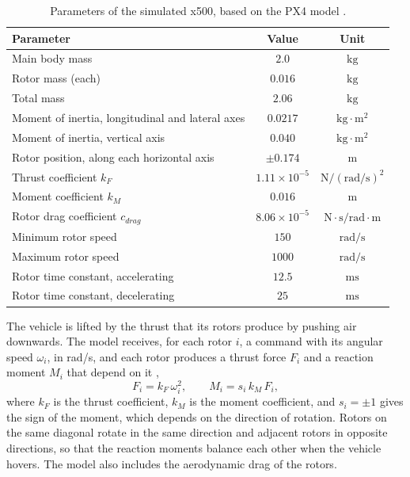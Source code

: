 \begin{table}[!htbp]
    \centering
    \caption{Parameters of the simulated x500, based on the PX4 model \cite{px4_x500_model}.}
    \label{tab:x500_parameters}
    \begin{tabular}{lcc}
        \toprule
        \textbf{Parameter} & \textbf{Value} & \textbf{Unit} \\
        \midrule
        Main body mass & $2.0$ & $\text{kg}$ \\
        Rotor mass (each) & $0.016$ & $\text{kg}$ \\
        Total mass & $2.06$ & $\text{kg}$ \\
        Moment of inertia, longitudinal and lateral axes & $0.0217$ & $\text{kg}\cdot\text{m}^2$ \\
        Moment of inertia, vertical axis & $0.040$ & $\text{kg}\cdot\text{m}^2$ \\
        Rotor position, along each horizontal axis & $\pm 0.174$ & $\text{m}$ \\
        \midrule
        Thrust coefficient $k_F$ & $1.11\times 10^{-5}$ & $\text{N}/(\text{rad/s})^2$ \\
        Moment coefficient $k_M$ & $0.016$ & $\text{m}$ \\
        Rotor drag coefficient $c_{drag}$ & $8.06\times 10^{-5}$ & $\text{N}\cdot\text{s}/\text{rad}\cdot\text{m}$ \\
        Minimum rotor speed & $150$ & $\text{rad/s}$ \\
        Maximum rotor speed & $1000$ & $\text{rad/s}$ \\
        Rotor time constant, accelerating & $12.5$ & $\text{ms}$ \\
        Rotor time constant, decelerating & $25$ & $\text{ms}$ \\
        \bottomrule
    \end{tabular}
\end{table}

The vehicle is lifted by the thrust that its rotors produce by pushing air downwards. The model receives, for each rotor $i$, a command with its angular speed $\omega_i$, in rad/s, and each rotor produces a thrust force $F_i$ and a reaction moment $M_i$ that depend on it \cite{mahony2012multirotor},
\begin{equation}
    F_i = k_F\,\omega_i^2, \qquad M_i = s_i\,k_M\,F_i,
    \label{eq:x500_rotor}
\end{equation}
where $k_F$ is the thrust coefficient, $k_M$ is the moment coefficient, and $s_i = \pm 1$ gives the sign of the moment, which depends on the direction of rotation. Rotors on the same diagonal rotate in the same direction and adjacent rotors in opposite directions, so that the reaction moments balance each other when the vehicle hovers. The model also includes the aerodynamic drag of the rotors.


